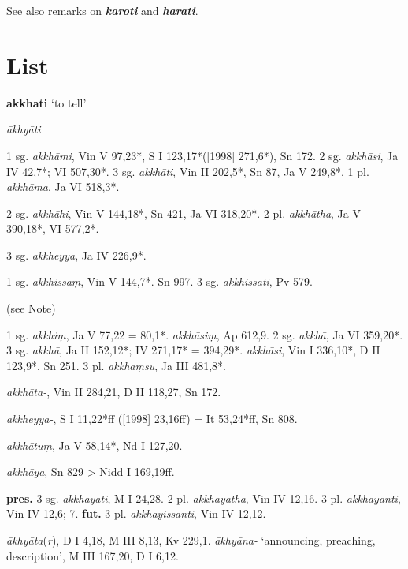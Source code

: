 \documentclass[11pt]{article}
\newcommand*\ṛ{r\symbol{"325}}
\newcommand*\Ṛ{R\symbol{"325}}
\newcommand*\ṝ{r\symbol{"304}\symbol{"325}}
\newcommand*\Ṝ{R\symbol{"304}\symbol{"325}}
\newcommand*\ḷ{l\symbol{"325}}
\newcommand*\ḹ{l\symbol{"304}\symbol{"325}}
\newcommand*\Ḷ{L\symbol{"325}}
\newcommand*\Ḹ{L\symbol{"304}\symbol{"325}}
\begin{document}
See also remarks on \textit{\textbf{karoti}} and \textit{\textbf{harati}}.





\pagebreak

\section{List}
%
%
\begin{center}
{\Large
\textbf{akkhati} `to tell'
}
\end{center}

\begin{description}[leftmargin=\parindent]
\item[ety.]
\textit{ākhyāti}
\end{description}

\begin{description}[leftmargin=\parindent]
\item[pres.] 1 sg. \textit{akkhāmi}, Vin V 97,23*, S I 123,17*([1998] 271,6*), Sn 172.
2 sg. \textit{akkhāsi}, Ja IV 42,7*; VI 507,30*.
3 sg. \textit{akkhāti}, Vin II 202,5*, Sn 87, Ja V 249,8*.
1 pl. \textit{akkhāma}, Ja VI 518,3*.
\item[imper.] 2 sg. \textit{akkhāhi}, Vin V 144,18*, Sn 421, Ja VI 318,20*.
2 pl. \textit{akkhātha}, Ja V 390,18*, VI 577,2*.
\item[opt.]
3 sg. \textit{akkheyya}, Ja IV 226,9*.
\item[fut.]
1 sg. \textit{akkhissaṃ}, Vin V 144,7*. Sn 997.
3 sg. \textit{akkhissati}, Pv 579.
\item[cond.]
[3 sg. \textit{akkhissa}, Pv 579] (see Note)
\item[pret.]
1 sg. \textit{akkhiṃ}, Ja V 77,22 = 80,1*.
\textit{akkhāsiṃ}, Ap 612,9.
2 sg. \textit{akkhā}, Ja VI 359,20*.
3 sg. \textit{akkhā}, Ja II 152,12*; IV 271,17* = 394,29*.
\textit{akkhāsi}, Vin I 336,10*, D II 123,9*, Sn 251.
3 pl. \textit{akkhaṃsu}, Ja III 481,8*.
\item[ppp.] \textit{akkhāta-}, Vin II 284,21, D II 118,27, Sn 172. 
\item[ger.] \textit{akkheyya-}, S I 11,22*ff ([1998] 23,16ff) = It 53,24*ff, Sn 808.
\item[inf.] \textit{akkhātuṃ}, Ja V 58,14*, Nd I 127,20.
\item[abs.] \textit{akkhāya}, Sn 829 > Nidd I 169,19ff.
\item[pass.]
\textbf{pres.}
3 sg. \textit{akkhāyati}, M I 24,28.
2 pl. \textit{akkhāyatha}, Vin IV 12,16.
3 pl. \textit{akkhāyanti}, Vin IV 12,6; 7.
\textbf{fut.}
3 pl. \textit{akkhāyissanti}, Vin IV 12,12.

\item[deriv.]
\textit{ākhyāta}(\textit{r}), D I 4,18, M III 8,13, Kv 229,1.
\textit{ākhyāna-} `announcing, preaching, description', M III 167,20, D I 6,12.

\end{description}
\end{document}
